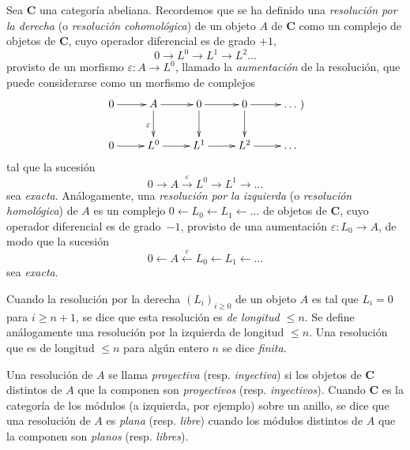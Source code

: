 \begin{env}[11.4.1]
\label{0.11.4.1}
\label{0.11.4.1-fr}
Sea $\boldsymbol{C}$ una categoría abeliana.
Recordemos que se ha definido una \emph{resolución por la derecha} (o \emph{resolución cohomológica}) de un objeto $A$ de $\boldsymbol{C}$ como un complejo de objetos de $\boldsymbol{C}$, cuyo operador diferencial es de grado $+1$,
\[
  0\longrightarrow L^0\longrightarrow L^1\longrightarrow L^2
  \ldots
\]
provisto de un morfismo $\varepsilon:A\to L^0$, llamado la \emph{aumentación} de la resolución, que puede considerarse como un morfismo de complejos
\[
\xymatrix{
  0\ar[r] & A\ar[r]\ar[d]_{\varepsilon} & 0\ar[r]\ar[d]
    & 0\ar[r]\ar[d] & \ldots\\
  0\ar[r] & L^0\ar[r] & L^1\ar[r] & L^2\ar[r] & \ldots
})
\]
tal que la sucesión
\[
  0\longrightarrow A\xrightarrow{\varepsilon}L^0\longrightarrow L^1
  \longrightarrow\ldots
\]
sea \emph{exacta}.
Análogamente, una \emph{resolución por la izquierda} (o \emph{resolución homológica}) de $A$ es un complejo $0\leftarrow L_0\leftarrow L_1\leftarrow\ldots$ de objetos de $\boldsymbol{C}$, cuyo operador diferencial es de grado~$-1$, provisto de una aumentación $\varepsilon:L_0\to A$, de modo que la sucesión
\[
  0\longleftarrow A\xleftarrow{\varepsilon}L_0\longleftarrow L_1
  \longleftarrow\ldots
\]
sea \emph{exacta}.

Cuando la resolución por la derecha $(L_i)_{i\geq0}$ de un objeto $A$ es tal que $L_i=0$ para $i\geq n+1$, se dice que esta resolución es \emph{de longitud $\leq n$}.
Se define análogamente una resolución por la izquierda de longitud $\leq n$.
Una resolución que es de longitud $\leq n$ para algún entero $n$ se dice \emph{finita}.

Una resolución de $A$ se llama \emph{proyectiva} (resp. \emph{inyectiva}) si los objetos de $\boldsymbol{C}$ distintos de $A$ que la componen son \emph{proyectivos} (resp. \emph{inyectivos}).
Cuando $\boldsymbol{C}$ es la categoría de los módulos (a izquierda, por ejemplo) sobre un anillo, se dice que una resolución de $A$ es \emph{plana} (resp. \emph{libre}) cuando los módulos distintos de $A$ que la componen son \emph{planos} (resp. \emph{libres}).
\end{env}


